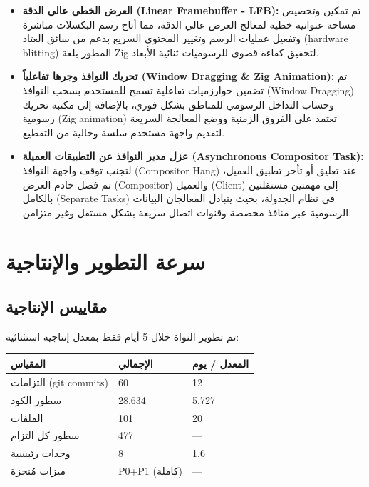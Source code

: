 \documentclass[12pt,a4paper]{article}
\theoremstyle{definition}
\newcommand{\en}[1]{\textenglish{#1}}
\begin{document}
\begin{itemize}[leftmargin=2em]
\item \textbf{العرض الخطي عالي الدقة (\en{Linear Framebuffer - LFB}):}
تم تمكين وتخصيص مساحة عنوانية خطية لمعالج العرض عالي الدقة، مما أتاح رسم البكسلات مباشرة وتفعيل عمليات الرسم وتغيير المحتوى السريع بدعم من سائق العتاد (\en{hardware blitting}) المطور بلغة Zig لتحقيق كفاءة قصوى للرسوميات ثنائية الأبعاد.

\item \textbf{تحريك النوافذ وجرها تفاعلياً (\en{Window Dragging \& Zig Animation}):}
تم تضمين خوارزميات تفاعلية تسمح للمستخدم بسحب النوافذ (\en{Window Dragging}) وحساب التداخل الرسومي للمناطق بشكل فوري، بالإضافة إلى مكتبة تحريك رسومية (\en{Zig animation}) تعتمد على الفروق الزمنية ووضع المعالجة السريعة لتقديم واجهة مستخدم سلسة وخالية من التقطيع.

\item \textbf{عزل مدير النوافذ عن التطبيقات العميلة (\en{Asynchronous Compositor Task}):}
لتجنب توقف واجهة النوافذ (\en{Compositor Hang}) عند تعليق أو تأخر تطبيق العميل، تم فصل خادم العرض (\en{Compositor}) والعميل (\en{Client}) إلى مهمتين مستقلتين بالكامل (\en{Separate Tasks}) في نظام الجدولة، بحيث يتبادل المعالجان البيانات الرسومية عبر منافذ مخصصة وقنوات اتصال سريعة بشكل مستقل وغير متزامن.
\end{itemize}

\newpage

\section{سرعة التطوير والإنتاجية}

\subsection{مقاييس الإنتاجية}

تم تطوير النواة خلال 5 أيام فقط بمعدل إنتاجية استثنائية:

\begin{center}
\begin{tabular}{L{5cm}C{3cm}C{3cm}}
\toprule
{}
\bfseries\color{white}\textarabic{المقياس} &
\bfseries\color{white}\textarabic{الإجمالي} &
\bfseries\color{white}\textarabic{المعدل / يوم} \\
\midrule
{} التزامات (git commits) & 60 & 12 \\
سطور الكود & 28,634 & 5,727 \\
 الملفات & 101 & 20 \\
سطور كل التزام & 477 & --- \\
 وحدات رئيسية & 8 & 1.6 \\
ميزات مُنجزة & P0+P1 (كاملة) & --- \\
\bottomrule
\end{tabular}
\end{center}
\end{document}
